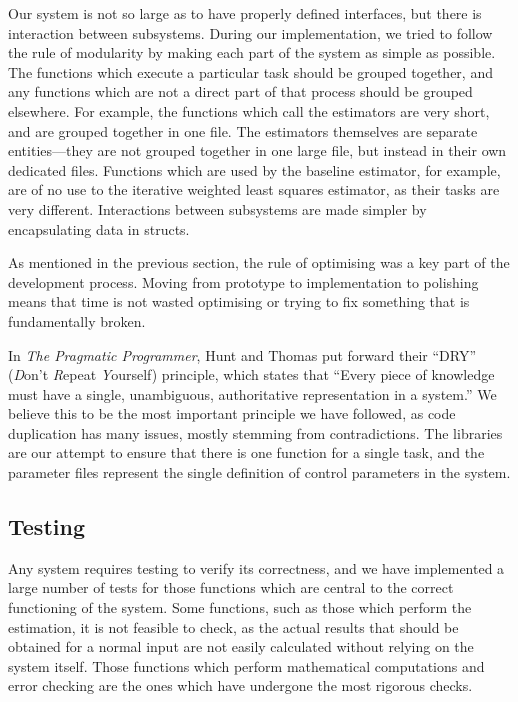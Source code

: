 \documentclass[a4paper,11pt]{article}
\begin{document}
   Our system is not so large as to have properly defined interfaces, but there
   is interaction between subsystems. During our implementation, we tried to
   follow the rule of modularity by making each part of the system as simple as
   possible. The functions which execute a particular task should be grouped
   together, and any functions which are not a direct part of that process
   should be grouped elsewhere. For example, the functions which call the
   estimators are very short, and are grouped together in one file. The
   estimators themselves are separate entities---they are not grouped together
   in one large file, but instead in their own dedicated files. Functions which
   are used by the baseline estimator, for example, are of no use to the
   iterative weighted least squares estimator, as their tasks are very
   different. Interactions between subsystems are made simpler by encapsulating
   data in structs.

   As mentioned in the previous section, the rule of optimising was a key part
   of the development process. Moving from prototype to implementation to
   polishing means that time is not wasted optimising or trying to fix something
   that is fundamentally broken.

   In \emph{The Pragmatic Programmer}, Hunt and Thomas put forward their ``DRY''
   (\emph{D}on't \emph{R}epeat \emph{Y}ourself) principle, which states that
   ``Every piece of knowledge must have a single, unambiguous, authoritative
   representation in a system.'' \cite{hunt1999pragmatic} We believe this to be
   the most important principle we have followed, as code duplication has many
   issues, mostly stemming from contradictions. The libraries are our attempt to
   ensure that there is one function for a single task, and the parameter files
   represent the single definition of control parameters in the system.
\subsection{Testing}
\label{sec-7-3}

   Any system requires testing to verify its correctness, and we have
   implemented a large number of tests for those functions which are central to
   the correct functioning of the system. Some functions, such as those which
   perform the estimation, it is not feasible to check, as the actual results
   that should be obtained for a normal input are not easily calculated without
   relying on the system itself. Those functions which perform mathematical
   computations and error checking are the ones which have undergone the most
   rigorous checks.
\end{document}
